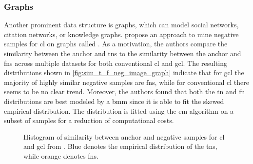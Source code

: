 \subsubsection{Graphs}\label{subsec:graph_distribution}

Another prominent data structure is graphs, which can model 
social networks, citation networks, or knowledge graphs.
\citet{progcl_2022} propose an approach to mine negative samples for \ac{cl} on graphs called \progcl{}. 
As a motivation, the authors compare the similarity between the anchor and \acp{tn} 
to the similarity between the anchor and \acp{fn} 
across multiple datasets for both conventional \ac{cl} and \ac{gcl}.
The resulting distributions shown in \autoref{fig:sim_t_f_neg_image_graph} 
indicate that for \ac{gcl} the majority of highly similar negative samples are \acp{fn}, 
while for conventional \ac{cl} there seems to be no clear trend.
Moreover, the authors found that both the \ac{tn} and \ac{fn} distributions are best modeled by a \ac{bmm} 
since it is able to fit the skewed empirical distribution.
The distribution is fitted using the \ac{em} algorithm on a subset of samples for a reduction of computational costs.

\begin{figure}%
    \centering
    \qquad
    \caption{Histogram of similarity between anchor and negative samples for \ac{cl} and \ac{gcl} from \citet{progcl_2022}.
    Blue denotes the empirical distribution of the \acp{tn}, while orange denotes \acp{fn}.}%
    \label{fig:sim_t_f_neg_image_graph}%
\end{figure}

